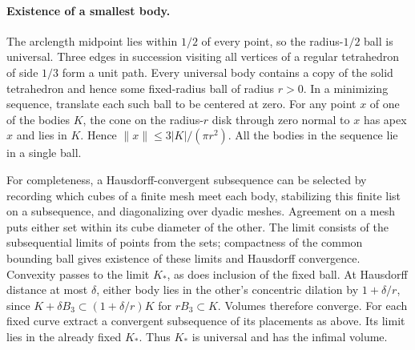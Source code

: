 \documentclass[11pt,letterpaper]{article}
\begin{document}
\paragraph{Existence of a smallest body.}
The arclength midpoint lies within $1/2$ of every point, so the
radius-$1/2$ ball is universal. Three edges in succession visiting
all vertices of a regular tetrahedron of side $1/3$ form a unit path.
Every universal body contains a copy of the solid tetrahedron and
hence some fixed-radius ball of radius $r>0$. In a minimizing sequence,
translate each such ball to be centered at zero. For any point $x$ of
one of the bodies $K$, the cone on the radius-$r$ disk through zero
normal to $x$ has apex $x$ and lies in $K$. Hence
$\|x\|\le3|K|/(\pi r^2)$. All the bodies in the sequence lie in a
single ball.

For completeness, a Hausdorff-convergent subsequence can be selected
by recording which cubes of a finite mesh meet each body, stabilizing
this finite list on a subsequence, and diagonalizing over dyadic meshes.
Agreement on a mesh puts either set within its cube diameter of the
other. The limit consists of the subsequential limits of points from the
sets; compactness of the common bounding ball gives existence of these
limits and Hausdorff convergence. Convexity passes to the limit $K_*$,
as does inclusion of the fixed ball. At Hausdorff distance at most
$\delta$, either body lies in the other's concentric dilation by
$1+\delta/r$, since $K+\delta B_3\subset (1+\delta/r)K$ for
$rB_3\subset K$. Volumes therefore converge. For each fixed curve
extract a convergent subsequence of its placements as above. Its limit
lies in the already fixed $K_*$. Thus $K_*$ is universal and has the
infimal volume.



\end{document}

